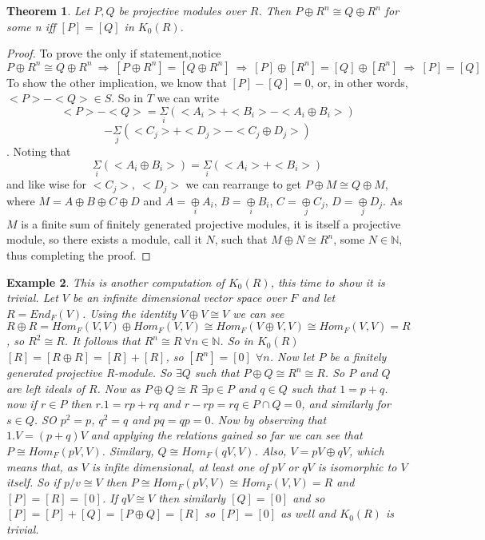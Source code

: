 \documentclass[a4paper,10pt]{article}
\newtheorem{thm}{Theorem}[subsection]
\newtheorem{ex}[thm]{Example}
\begin{document}
\begin{thm}
	Let $P,Q$ be projective modules over $R$. Then $P\oplus R^{n}\cong Q\oplus R^{n}$ for some n iff $[P]=[Q]$ in $K_{0}(R)$.
\end{thm}
\begin{proof}
	To prove the only if statement,notice $P\oplus R^{n}\cong Q\oplus R^{n} \ \Rightarrow \ [P\oplus R^{n}]=[Q\oplus R^{n}] \ \Rightarrow  \ [P]\oplus [R^{n}]=[Q]\oplus [R^{n}] \ \Rightarrow \ [P]=[Q]$
	\newline To show the other implication, we know that $[P]-[Q]=0$, or, in other words, $<P>-<Q>\in S$. So in $T$ we can write $$<P>-<Q>=\underset{i}{\Sigma}(<A_{i}>+<B_{i}>-<A_{i}\oplus B_{i}>)$$ $$-\underset{j}{\Sigma}(<C_{j}>+<D_{j}>-<C_{j}\oplus D_{j}>)$$. Noting that $$\underset{i}{\Sigma}(<A_{i}\oplus B_{i}>)=\underset{i}{\Sigma}(<A_{i}>+<B_{i}>)$$ and like wise for $<C_{j}>,\ <D_{j}>$ we can rearrange to get $P\oplus M\cong Q\oplus M$, where $M=A\oplus B\oplus C\oplus D$ and $A=\underset{i}{\oplus}A_{i}$, $B=\underset{i}{\oplus}B_{i}$, $C=\underset{j}{\oplus}C_{j}$, $D=\underset{j}{\oplus}D_{j}$. As $M$ is a finite sum of finitely generated projective modules, it is itself a projective module, so there exists a module, call it $N$, such that $M\oplus N\cong R^{n}$, some $N\in \mathbb{N}$, thus completing the proof.
\end{proof}

\begin{ex}
	This is another computation of $K_{0}(R)$, this time to show it is trivial. Let $V$ be an infinite dimensional vector space over $F$ and let $R=End_{F}(V)$. Using the identity $V\oplus V\cong V$ we can see $$R\oplus R=Hom_{F}(V,V)\oplus Hom_{F}(V,V)\cong Hom_{F}(V\oplus V,V)\cong Hom_{F}(V,V)=R$$, so $R^{2}\cong R$. It follows that $R^{n}\cong R \ \forall n\in \mathbb{N}$.
	\newline So in $K_{0}(R)$ $[R]=[R\oplus R]=[R]+[R]$, so $[R^{n}]=[0]$ $\forall n$.
	Now let $P$ be a finitely generated projective R-module. So $\exists Q$ such that $P\oplus Q\cong R^{n}\cong R$. So $P$ and $Q$ are left ideals of $R$. Now as $P\oplus Q\cong R$ $\exists p\in P$ and $q\in Q$ such that $1=p+q$. now if $r\in P$ then $r.1=rp+rq$ and $r-rp=rq\in P\cap Q=0$, and similarly for $s\in Q$. SO $p^{2}=p$, $q^{2}=q$ and $pq=qp=0$. Now by observing that $1.V=(p+q)V$ and applying the relations gained so far we can see that $P\cong Hom_{F}(pV,V)$. Similary, $Q\cong Hom_{F}(qV,V)$.
	Also, $V=pV\oplus qV$, which means that, as $V$ is infite dimensional, at least one of $pV$ or $qV$ is isomorphic to $V$ itself.
	\newline So if $p/v\cong V$ then $P\cong Hom_{F}(pV,V)\cong Hom_{F}(V,V)=R$ and $[P]=[R]=[0]$. If $qV\cong V$ then similarly $[Q]=[0]$ and so $[P]=[P]+[Q]=[P\oplus Q]=[R]$ so $[P]=[0]$ as well and $K_{0}(R)$ is trivial.
\end{ex}
\end{document}
